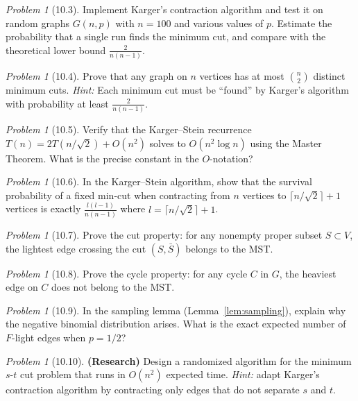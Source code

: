 \documentclass[twoside,12pt]{book}
\theoremstyle{plain}
\theoremstyle{definition}
\theoremstyle{remark}
\newtheorem{problem}[theorem]{Problem}
\begin{document}
\begin{problem}[10.3]
Implement Karger's contraction algorithm and test it on random graphs $G(n, p)$ with $n = 100$ and various values of $p$. Estimate the probability that a single run finds the minimum cut, and compare with the theoretical lower bound $\frac{2}{n(n-1)}$.
\end{problem}

\begin{problem}[10.4]
Prove that any graph on $n$ vertices has at most $\binom{n}{2}$ distinct minimum cuts. \textit{Hint:} Each minimum cut must be ``found'' by Karger's algorithm with probability at least $\frac{2}{n(n-1)}$.
\end{problem}

\begin{problem}[10.5]
Verify that the Karger--Stein recurrence $T(n) = 2T(n/\sqrt{2}) + O(n^2)$ solves to $O(n^2 \log n)$ using the Master Theorem. What is the precise constant in the $O$-notation?
\end{problem}

\begin{problem}[10.6]
In the Karger--Stein algorithm, show that the survival probability of a fixed min-cut when contracting from $n$ vertices to $\lceil n/\sqrt{2} \rceil + 1$ vertices is exactly $\frac{l(l-1)}{n(n-1)}$ where $l = \lceil n/\sqrt{2} \rceil + 1$.
\end{problem}

\begin{problem}[10.7]
Prove the cut property: for any nonempty proper subset $S \subset V$, the lightest edge crossing the cut $(S, \bar{S})$ belongs to the MST.
\end{problem}

\begin{problem}[10.8]
Prove the cycle property: for any cycle $C$ in $G$, the heaviest edge on $C$ does not belong to the MST.
\end{problem}

\begin{problem}[10.9]
In the sampling lemma (Lemma~\ref{lem:sampling}), explain why the negative binomial distribution arises. What is the exact expected number of $F$-light edges when $p = 1/2$?
\end{problem}

\begin{problem}[10.10]
\textbf{(Research)} Design a randomized algorithm for the minimum $s$-$t$ cut problem that runs in $O(n^2)$ expected time. \textit{Hint:} adapt Karger's contraction algorithm by contracting only edges that do not separate $s$ and $t$.
\end{problem}
\end{document}
